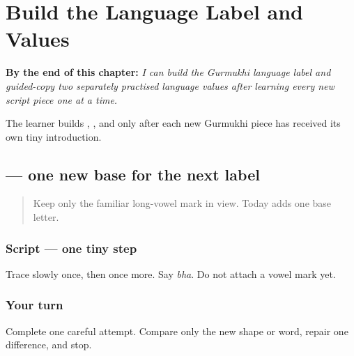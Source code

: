 
\chapter{Build the Language Label and Values}
\label{ch:pa-form-language-pieces}

\begin{chapteropening}
\textbf{By the end of this chapter:} \emph{I can build the Gurmukhi language label and guided-copy two separately practised language values after learning every new script piece one at a time.}

The learner builds , , and  only after each new Gurmukhi piece has received its own tiny introduction.
\end{chapteropening}

\section[\texorpdfstring{\pa{ਭ} (bha)}{ਭ (bha)}]{ — one new base for the next label}

\label{lesson:PA-W03-bha}



\begin{quote}
Keep only the familiar long-vowel mark \textbf{} in view. Today adds one base letter.
\end{quote}

\subsection*{Script — one tiny step}

Trace \textbf{} slowly once, then once more. Say \emph{bha}. Do not attach a vowel mark yet.

\subsection*{Your turn}
Complete one careful attempt. Compare only the new shape or word, repair one difference, and stop.

